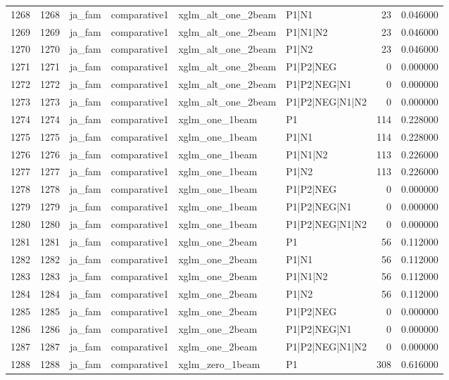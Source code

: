 \begin{tabular}{lrllllrr}
1268 & 1268 & ja_fam & comparative1 & xglm_alt_one_2beam & P1|N1 & 23 & 0.046000 \\
1269 & 1269 & ja_fam & comparative1 & xglm_alt_one_2beam & P1|N1|N2 & 23 & 0.046000 \\
1270 & 1270 & ja_fam & comparative1 & xglm_alt_one_2beam & P1|N2 & 23 & 0.046000 \\
1271 & 1271 & ja_fam & comparative1 & xglm_alt_one_2beam & P1|P2|NEG & 0 & 0.000000 \\
1272 & 1272 & ja_fam & comparative1 & xglm_alt_one_2beam & P1|P2|NEG|N1 & 0 & 0.000000 \\
1273 & 1273 & ja_fam & comparative1 & xglm_alt_one_2beam & P1|P2|NEG|N1|N2 & 0 & 0.000000 \\
1274 & 1274 & ja_fam & comparative1 & xglm_one_1beam & P1 & 114 & 0.228000 \\
1275 & 1275 & ja_fam & comparative1 & xglm_one_1beam & P1|N1 & 114 & 0.228000 \\
1276 & 1276 & ja_fam & comparative1 & xglm_one_1beam & P1|N1|N2 & 113 & 0.226000 \\
1277 & 1277 & ja_fam & comparative1 & xglm_one_1beam & P1|N2 & 113 & 0.226000 \\
1278 & 1278 & ja_fam & comparative1 & xglm_one_1beam & P1|P2|NEG & 0 & 0.000000 \\
1279 & 1279 & ja_fam & comparative1 & xglm_one_1beam & P1|P2|NEG|N1 & 0 & 0.000000 \\
1280 & 1280 & ja_fam & comparative1 & xglm_one_1beam & P1|P2|NEG|N1|N2 & 0 & 0.000000 \\
1281 & 1281 & ja_fam & comparative1 & xglm_one_2beam & P1 & 56 & 0.112000 \\
1282 & 1282 & ja_fam & comparative1 & xglm_one_2beam & P1|N1 & 56 & 0.112000 \\
1283 & 1283 & ja_fam & comparative1 & xglm_one_2beam & P1|N1|N2 & 56 & 0.112000 \\
1284 & 1284 & ja_fam & comparative1 & xglm_one_2beam & P1|N2 & 56 & 0.112000 \\
1285 & 1285 & ja_fam & comparative1 & xglm_one_2beam & P1|P2|NEG & 0 & 0.000000 \\
1286 & 1286 & ja_fam & comparative1 & xglm_one_2beam & P1|P2|NEG|N1 & 0 & 0.000000 \\
1287 & 1287 & ja_fam & comparative1 & xglm_one_2beam & P1|P2|NEG|N1|N2 & 0 & 0.000000 \\
1288 & 1288 & ja_fam & comparative1 & xglm_zero_1beam & P1 & 308 & 0.616000 \\

\end{tabular}
